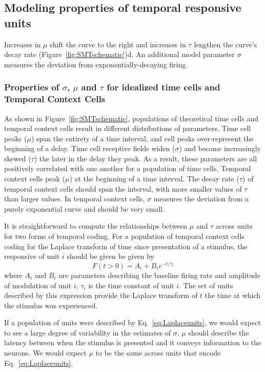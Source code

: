\documentclass{apa}
\begin{document}
\subsection{Modeling properties of temporal responsive units}
Increases in
$\mu$ shift the curve to the right and increases in $\tau$ lengthen the
curve's decay rate (Figure~\ref{fig:SMTschematic})d. 
An additional model parameter $\sigma$ measures the deviation from exponentially-decaying
firing. 


\subsubsection{Properties of $\sigma$, $\mu$ and $\tau$ for idealized time cells
and Temporal Context Cells}

As shown in Figure~\ref{fig:SMTschematic}, populations of theoretical time cells
and temporal context cells result in different distributions of parameters. Time
cell peaks ($\mu$) span the entirety of a time interval, and cell peaks over-represent
the beginning of a delay. Time cell receptive fields widen 
($\sigma$) and become increasingly skewed ($\tau$) the later in the delay they
peak. As a result, these parameters are all positively correlated with one another
for a population of time cells. Temporal context cells peak ($\mu$) at the
beginning of a time interval. The decay rate ($\tau$) of temporal
context cells should span the interval, with more smaller values of
$\tau$ than larger values. In temporal context cells, $\sigma$ measures
the deviation from a purely exponential curve and should be very small.  

It is straightforward to compute the relationships between $\mu$ and $\tau$
across units for two forms of temporal coding.  For a population of temporal
context cells coding for the Laplace transform of time since presentation of a
stimulus, the responsive of unit $i$ should be given be given by 
\begin{equation}
		F(t > 0) = A_i + B_i e^{- t/\tau_i}
		\label{eq:Laplaceunits}
\end{equation}
where $A_i$ and $B_i$ are parameters describing the baseline firing rate and
amplitude of modulation of unit $i$, $\tau_i$ is the time constant of unit
$i$.
The set of units described by this expression provide the Laplace transform of
$t$ the time at which the stimulus was experienced.

If a population of units were described by Eq.~\ref{eq:Laplaceunits}, we would
expect to see a large degree of variability in the estimates of $\sigma$.  
$\mu$ should describe the latency between when the stimulus is presented and
it conveys information to the neurons.  We would expect $\mu$ to be the same
across units that encode Eq.~\ref{eq:Laplaceunits}.
\end{document}
